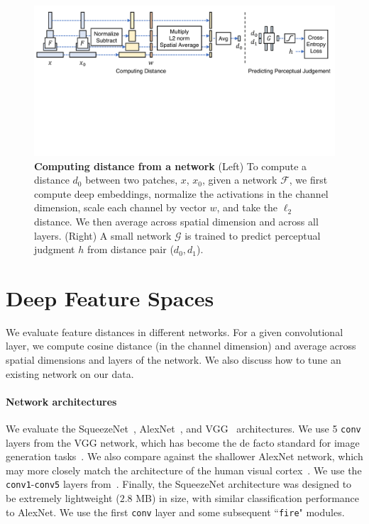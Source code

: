 \begin{figure}
  \centering
  \includegraphics[width=1.0\linewidth]{imgs/network.pdf}
\vspace{-6mm}
\caption{\textbf{Computing distance from a network} (Left) To compute a distance $d_0$ between two patches, $x$, $x_0$, given a network $\mathcal{F}$, we first compute deep embeddings, normalize the activations in the channel dimension, scale each channel by vector $w$, and take the $\ell_2$ distance. We then average across spatial dimension and across all layers. (Right) A small network $\mathcal{G}$ is trained to predict perceptual judgment $h$ from distance pair ($d_0,d_1$).}
\label{fig:network}
\vspace{-1mm}
\end{figure}



\section{Deep Feature Spaces}

We evaluate feature distances in different networks. For a given convolutional layer, we compute cosine distance (in the channel dimension) and average across spatial dimensions and layers of the network. We also discuss how to tune an existing network on our data.

\paragraph{Network architectures} We evaluate the SqueezeNet~\cite{iandola2016squeezenet}, AlexNet~\cite{krizhevsky2012imagenet}, and VGG~\cite{simonyan2014very} architectures. We use 5 \texttt{conv} layers from the VGG network, which has become the de facto standard for image generation tasks~\cite{gatys2016image,dosovitskiy2016generating,chen2017photographic}.
We also compare against the shallower AlexNet network, which may more closely match the architecture of the human visual cortex~\cite{yamins2016using}. 
We use the \texttt{conv1}-\texttt{conv5} layers from~\cite{krizhevsky2014one}. Finally, the SqueezeNet architecture was designed to be extremely lightweight ($2.8$ MB) in size, with similar classification performance to AlexNet. We use the first \texttt{conv} layer and some subsequent ``\texttt{fire}" modules.

